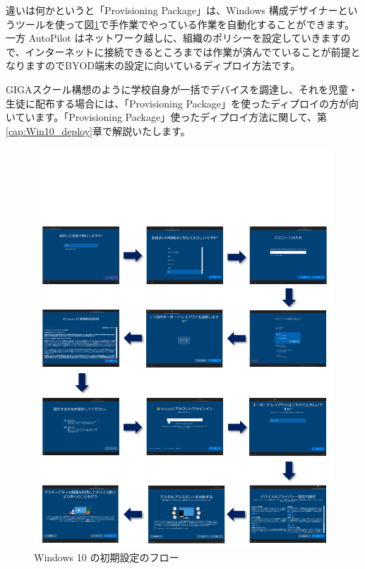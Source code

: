 違いは何かというと「Provisioning Package」は、Windows 構成デザイナーというツールを使って図\ref{fig:Win10_Kitting}で手作業でやっている作業を自動化することができます。一方 AutoPilot はネットワーク越しに、組織のポリシーを設定していきますので、インターネットに接続できるところまでは作業が済んでていることが前提となりますのでBYOD端末の設定に向いているディプロイ方法です。

GIGAスクール構想のように学校自身が一括でデバイスを調達し、それを児童・生徒に配布する場合には、「Provisioning Package」を使ったディプロイの方が向いています。「Provisioning Package」使ったディプロイ方法に関して、第\ref{cap:Win10_deploy}章で解説いたします。

\begin{figure}[t]
    \centering
    \vspace{-6cm}
    \includegraphics[width=17cm]{figures/Win10_Kitting.png}
    \caption{Windows 10 の初期設定のフロー}
    \label{fig:Win10_Kitting}
\end{figure}


